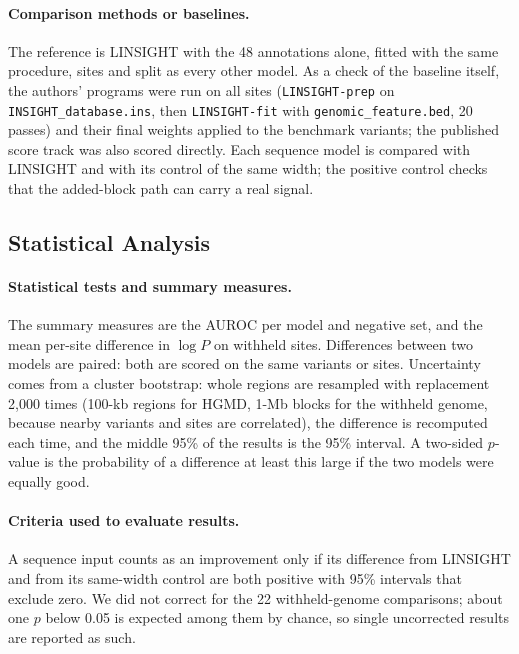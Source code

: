 \documentclass[11pt]{article}
\newcommand{\file}[1]{\nolinkurl{#1}}
\begin{document}
\paragraph{Comparison methods or baselines.} The reference is LINSIGHT with the 48 annotations alone,
fitted with the same procedure, sites and split as every other model. As a check of the baseline itself,
the authors' programs were run on all sites (\file{LINSIGHT-prep} on \file{INSIGHT_database.ins}, then
\file{LINSIGHT-fit} with \file{genomic_feature.bed}, 20 passes) and their final weights applied to the
benchmark variants; the published score track was also scored directly. Each sequence model is compared
with LINSIGHT and with its control of the same width; the positive control checks that the added-block path
can carry a real signal.

\subsection*{Statistical Analysis}
\paragraph{Statistical tests and summary measures.} The summary measures are the AUROC per model and
negative set, and the mean per-site difference in $\log P$ on withheld sites. Differences between two
models are paired: both are scored on the same variants or sites. Uncertainty comes from a cluster
bootstrap: whole regions are resampled with replacement 2,000 times (100-kb
regions for HGMD, 1-Mb blocks for the withheld genome, because nearby variants and sites are correlated),
the difference is recomputed each time, and the middle 95\% of the results is the 95\% interval. A
two-sided $p$-value is the probability of a difference at least this large if the two models were equally
good.

\paragraph{Criteria used to evaluate results.} A sequence input counts as an improvement only if its
difference from LINSIGHT and from its same-width control are both positive with 95\% intervals that
exclude zero. We did not correct for the 22 withheld-genome comparisons; about one $p$ below 0.05 is
expected among them by chance, so single uncorrected results are reported as such.
\end{document}
